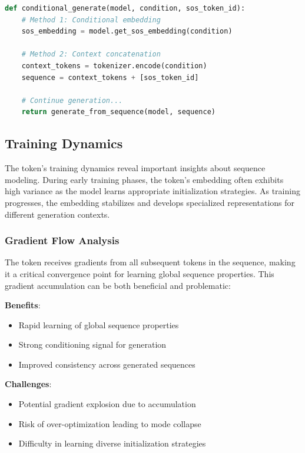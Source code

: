 \begin{lstlisting}[language=Python, caption=Conditional generation with \sos{} token]
def conditional_generate(model, condition, sos_token_id):
    # Method 1: Conditional embedding
    sos_embedding = model.get_sos_embedding(condition)
    
    # Method 2: Context concatenation
    context_tokens = tokenizer.encode(condition)
    sequence = context_tokens + [sos_token_id]
    
    # Continue generation...
    return generate_from_sequence(model, sequence)
\end{lstlisting}

\subsection{Training Dynamics}

The \sos{} token's training dynamics reveal important insights about sequence modeling. During early training phases, the \sos{} token's embedding often exhibits high variance as the model learns appropriate initialization strategies. As training progresses, the embedding stabilizes and develops specialized representations for different generation contexts.

\subsubsection{Gradient Flow Analysis}

The \sos{} token receives gradients from all subsequent tokens in the sequence, making it a critical convergence point for learning global sequence properties. This gradient accumulation can be both beneficial and problematic:

\textbf{Benefits}:
\begin{itemize}
\item Rapid learning of global sequence properties
\item Strong conditioning signal for generation
\item Improved consistency across generated sequences
\end{itemize}

\textbf{Challenges}:
\begin{itemize}
\item Potential gradient explosion due to accumulation
\item Risk of over-optimization leading to mode collapse
\item Difficulty in learning diverse initialization strategies
\end{itemize}

